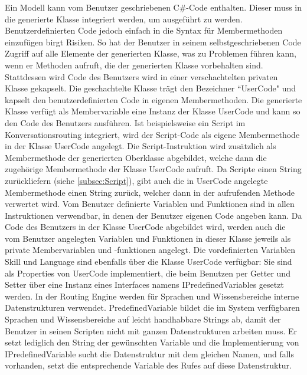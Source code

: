 \newline
Ein Modell kann vom Benutzer geschriebenen C\#-Code enthalten. Dieser muss in die generierte Klasse integriert werden, um ausgeführt zu werden. Benutzerdefinierten Code jedoch einfach in die Syntax für Membermethoden einzufügen birgt Risiken. So hat der Benutzer in seinem selbstgeschriebenen Code Zugriff auf alle Elemente der generierten Klasse, was zu Problemen führen kann, wenn er Methoden aufruft, die der generierten Klasse vorbehalten sind. Stattdessen wird Code des Benutzers wird in einer verschachtelten privaten Klasse gekapselt. Die geschachtelte Klasse trägt den Bezeichner ``UserCode" und kapselt den benutzerdefinierten Code in eigenen Membermethoden. Die generierte Klasse verfügt als Membervariable eine Instanz der Klasse UserCode und kann so den Code des Benutzers ausführen. Ist beispielsweise ein Script im Konversationsrouting integriert, wird der Script-Code als eigene Membermethode in der Klasse UserCode angelegt. Die Script-Instruktion wird zusätzlich als Membermethode der generierten Oberklasse abgebildet, welche dann die zugehörige Membermethode der Klasse UserCode aufruft. Da Scripte einen String zurückliefern (siehe \ref{subsec:Script}), gibt auch die in UserCode angelegte Membermethode einen String zurück, welcher dann in der aufrufenden Methode verwertet wird.
\newline
Vom Benutzer definierte Variablen und Funktionen sind in allen Instruktionen verwendbar, in denen der Benutzer eigenen Code angeben kann. Da Code des Benutzers in der Klasse UserCode abgebildet wird, werden auch die vom Benutzer angelegten Variablen und Funktionen in dieser Klasse jeweils als private Membervariablen und -funktionen angelegt. Die vordefinierten Variablen Skill und Language sind ebenfalls über die Klasse UserCode verfügbar: Sie sind als Properties von UserCode implementiert, die beim Benutzen per Getter und Setter über eine Instanz eines Interfaces namens IPredefinedVariables gesetzt werden. In der Routing Engine werden für Sprachen und Wissensbereiche interne Datenstrukturen verwendet. PredefinedVariable bildet die im System verfügbaren Sprachen und Wissensbereiche auf leicht handhabbare Strings ab, damit der Benutzer in seinen Scripten nicht mit ganzen Datenstrukturen arbeiten muss. Er setzt lediglich den String der gewünschten Variable und die Implementierung von IPredefinedVariable sucht die Datenstruktur mit dem gleichen Namen, und falls vorhanden, setzt die entsprechende Variable des Rufes auf diese Datenstruktur.
\newline
